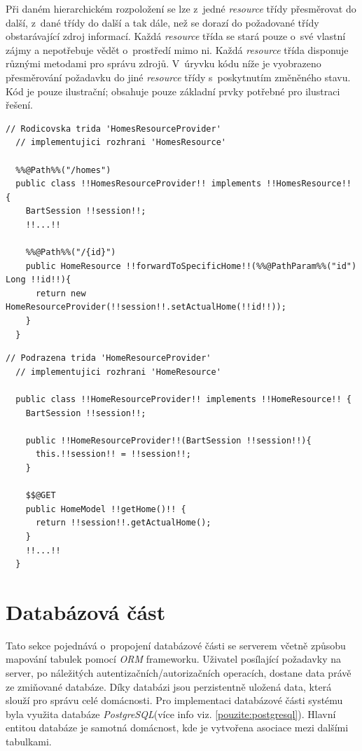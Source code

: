 Při daném hierarchickém rozpoložení se lze z~jedné \emph{resource} třídy přesměrovat do další, z~dané třídy do další a tak dále, než se dorazí do požadované třídy obstarávající zdroj informací.
Každá \emph{resource} třída se stará pouze o~své vlastní zájmy a nepotřebuje vědět o~prostředí mimo ni.
Každá \emph{resource} třída disponuje různými metodami pro správu zdrojů.
V~úryvku kódu níže je vyobrazeno přesměrování požadavku do jiné \emph{resource} třídy s~poskytnutím změněného stavu.
Kód je pouze ilustrační; obsahuje pouze základní prvky potřebné pro ilustraci řešení.
\newpage
\begin{lstlisting}[style=JavaStyle, caption={Ukázka přesměrování požadavku}]
  // Rodicovska trida 'HomesResourceProvider'
  // implementujici rozhrani 'HomesResource'

  %%@Path%%("/homes")
  public class !!HomesResourceProvider!! implements !!HomesResource!! {
    BartSession !!session!!;
    !!...!!

    %%@Path%%("/{id}")
    public HomeResource !!forwardToSpecificHome!!(%%@PathParam%%("id") Long !!id!!){
      return new HomeResourceProvider(!!session!!.setActualHome(!!id!!));
    }
  }
\end{lstlisting}

\begin{lstlisting}[style=JavaStyle, caption={Ukázka zpracování požadavku z~přesměrované třídy}]
  // Podrazena trida 'HomeResourceProvider'
  // implementujici rozhrani 'HomeResource'

  public class !!HomeResourceProvider!! implements !!HomeResource!! {
    BartSession !!session!!;

    public !!HomeResourceProvider!!(BartSession !!session!!){
      this.!!session!! = !!session!!;
    }

    $$@GET
    public HomeModel !!getHome()!! {
      return !!session!!.getActualHome();
    }
    !!...!!
  }
\end{lstlisting}

\newpage
\section{Databázová část}
\label{impl:databaze}
Tato sekce pojednává o~propojení databázové části se serverem včetně způsobu mapování tabulek pomocí \emph{ORM} frameworku.
Uživatel posílající požadavky na server, po náležitých autentizačních/autorizačních operacích, dostane data právě ze zmiňované databáze.
Díky databázi jsou perzistentně uložená data, která slouží pro správu celé domácnosti.
Pro implementaci databázové části systému byla využita databáze \emph{PostgreSQL}(více info viz. \ref{pouzite:postgresql}).
Hlavní entitou databáze je samotná domácnost, kde je vytvořena asociace mezi dalšími tabulkami.


